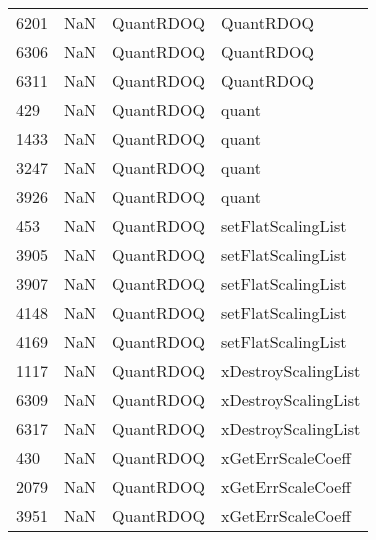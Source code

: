 \begin{tabular}{llll}
6201 &                   NaN &                  QuantRDOQ &                                 QuantRDOQ \\
6306 &                   NaN &                  QuantRDOQ &                                 QuantRDOQ \\
6311 &                   NaN &                  QuantRDOQ &                                 QuantRDOQ \\
429  &                   NaN &                  QuantRDOQ &                                     quant \\
1433 &                   NaN &                  QuantRDOQ &                                     quant \\
3247 &                   NaN &                  QuantRDOQ &                                     quant \\
3926 &                   NaN &                  QuantRDOQ &                                     quant \\
453  &                   NaN &                  QuantRDOQ &                        setFlatScalingList \\
3905 &                   NaN &                  QuantRDOQ &                        setFlatScalingList \\
3907 &                   NaN &                  QuantRDOQ &                        setFlatScalingList \\
4148 &                   NaN &                  QuantRDOQ &                        setFlatScalingList \\
4169 &                   NaN &                  QuantRDOQ &                        setFlatScalingList \\
1117 &                   NaN &                  QuantRDOQ &                       xDestroyScalingList \\
6309 &                   NaN &                  QuantRDOQ &                       xDestroyScalingList \\
6317 &                   NaN &                  QuantRDOQ &                       xDestroyScalingList \\
430  &                   NaN &                  QuantRDOQ &                         xGetErrScaleCoeff \\
2079 &                   NaN &                  QuantRDOQ &                         xGetErrScaleCoeff \\
3951 &                   NaN &                  QuantRDOQ &                         xGetErrScaleCoeff \\

\end{tabular}

